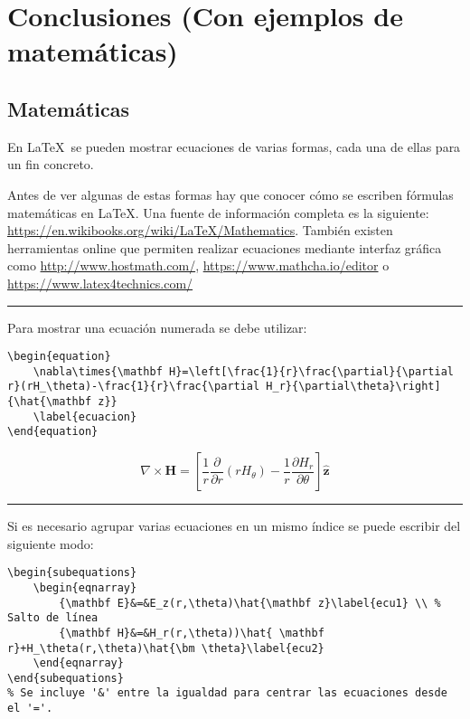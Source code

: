 \chapter{Conclusiones (Con ejemplos de matemáticas)}
\label{conclusiones}

\section{Matemáticas}

En \LaTeX~se pueden mostrar ecuaciones de varias formas, cada una de ellas para un fin concreto.
\par Antes de ver algunas de estas formas hay que conocer cómo se escriben fórmulas matemáticas en \LaTeX. Una fuente de información completa es la siguiente: \url{https://en.wikibooks.org/wiki/LaTeX/Mathematics}. También existen herramientas online que permiten realizar ecuaciones mediante interfaz gráfica como \url{http://www.hostmath.com/}, \url{https://www.mathcha.io/editor} o \url{https://www.latex4technics.com/}
\vspace{1em}
\noindent\hrule
\vspace{1em}
Para mostrar una ecuación numerada se debe utilizar:
\begin{lstlisting}[style=Latex-color,label=latex_code1]
\begin{equation}
	\nabla\times{\mathbf H}=\left[\frac{1}{r}\frac{\partial}{\partial r}(rH_\theta)-\frac{1}{r}\frac{\partial H_r}{\partial\theta}\right]{\hat{\mathbf z}}
	\label{ecuacion}
\end{equation}
\end{lstlisting}
\begin{equation}
  \nabla\times{\mathbf H}=\left[\frac{1}{r}\frac{\partial}{\partial
        r}(rH_\theta)-\frac{1}{r}\frac{\partial
        H_r}{\partial\theta}\right]{\hat{\mathbf z}}
        \label{ecuacion}
\end{equation}
\vspace{1em}
\noindent\hrule
\vspace{1em}
Si es necesario agrupar varias ecuaciones en un mismo índice se puede escribir del siguiente modo:

\begin{lstlisting}[style=Latex-color,label=latex_code2]
\begin{subequations}
	\begin{eqnarray}
    	{\mathbf E}&=&E_z(r,\theta)\hat{\mathbf z}\label{ecu1} \\ % Salto de línea
    	{\mathbf H}&=&H_r(r,\theta))\hat{ \mathbf r}+H_\theta(r,\theta)\hat{\bm \theta}\label{ecu2}
	\end{eqnarray}
\end{subequations}
% Se incluye '&' entre la igualdad para centrar las ecuaciones desde el '='.
\end{lstlisting}


